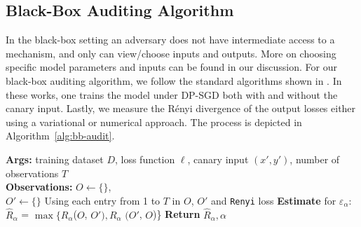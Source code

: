 \documentclass{article}
\theoremstyle{plain}
\theoremstyle{definition}
\theoremstyle{remark}
\begin{document}
\subsection{Black-Box Auditing Algorithm}
In the black-box setting an adversary does not have intermediate access to a mechanism, and only can view/choose inputs and outputs. More on choosing specific model parameters and inputs can be found in our discussion. For our black-box auditing algorithm, we follow the standard algorithms shown in \cite{nasr2023tight, muthu2024nearly}. In these works, one trains the model under DP-SGD both with and without the canary input. Lastly, we measure the R\'enyi divergence of the output losses either using a variational or numerical approach. The process is depicted in Algorithm~\ref{alg:bb-audit}.


\begin{algorithm}%
\caption{Black-box auditing for DP-SGD with Renyi divergence}
\label{alg:bb-audit}
\textbf{Args:} training dataset $D$, loss function $\ell$, canary input $(x',y')$, number of observations $T$\\
\textbf{Observations:} $O \gets \{\}$,\\ $O' \gets \{\}$
Using each entry from 1 to $T$ in $O$, $O'$ and \texttt{Renyi} loss\;
\textbf{Estimate} for $\varepsilon_\alpha$: $\widehat R_\alpha$ = $\max\{R_\alpha$($O$, $O'),R_\alpha$ $(O'$, $O$)\}\;
\textbf{Return} $\widehat R_\alpha, \alpha$
\end{algorithm}
\end{document}
